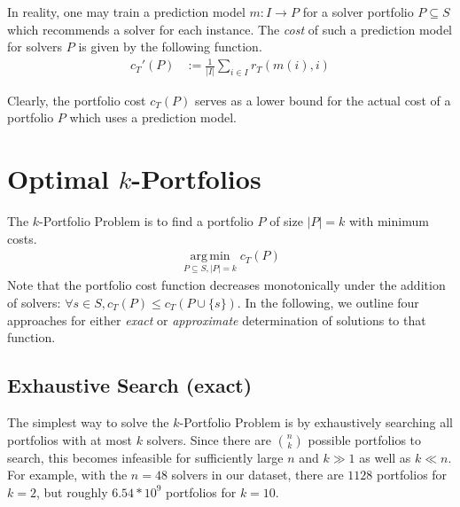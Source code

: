 \documentclass[conference]{IEEEtran}
\DeclareMathOperator*{\argmin}{arg\,min}
\begin{document}
In reality, one may train a prediction model $m : I \rightarrow P$ for a solver portfolio $P \subseteq S$ which recommends a solver for each instance. 
The \emph{cost} of such a prediction model for solvers $P$ is given by the following function.%
\begin{align*}
	c_{T}'(P) &:= \frac{1}{|I|} \sum\limits_{i \in I}{r_T(m(i),i)}
\end{align*}%

Clearly, the portfolio cost $c_{T}(P)$ serves as a lower bound for the actual cost of a portfolio $P$ which uses a prediction model.



\section{Optimal $k$-Portfolios}
\label{sec:approach}

The $k$-Portfolio Problem is to find a portfolio $P$ of size $|P| = k$ with minimum costs.%
\begin{align*}
\argmin\limits_{P \subseteq S, |P| = k} c_{T}(P)
\end{align*}%
%
Note that the portfolio cost function decreases monotonically under the addition of solvers: $\forall s \in S, c_{T}(P) \leq c_{T}(P \cup \{s\})$. 
In the following, we outline four approaches for either \emph{exact} or \emph{approximate} determination of solutions to that function. 


\subsection{Exhaustive Search (exact)}

The simplest way to solve the $k$-Portfolio Problem is by exhaustively searching all portfolios with at most $k$ solvers. 
Since there are $\binom{n}{k}$ possible portfolios to search, this becomes infeasible for sufficiently large $n$ and $k \gg 1$ as well as $k \ll n$.
For example, with the $n=48$ solvers in our dataset, there are $1128$ portfolios for $k=2$, but roughly $6.54 * 10^9$ portfolios for $k=10$.
\end{document}
